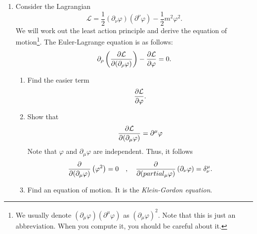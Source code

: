 \documentclass[a4paper,pdftex]{article}
\begin{document}
\begin{enumerate}
   \item 
   Consider the Lagrangian
   \begin{equation}
      \mathcal{L}
      =
      \frac{1}{2}
      (\partial_{\nu}\varphi)
      (\partial^{\nu}\varphi)
      -
      \frac{1}{2}m^2\varphi^2
      .
   \end{equation}
   We will work out the least action principle and derive the equation of motion\footnote{
      We usually denote $(\partial_{\mu}\varphi)(\partial^{\mu}\varphi)$ as $(\partial_{\mu}\varphi)^2$. Note that this is just an abbreviation. When you compute it, you should be careful about it.
   }. The Euler-Lagrange equation is as follows:
   \begin{equation}
      \partial_{\rho}
      \left(  
         \pdv{\mathcal{L}}{(\partial_{\rho}\varphi)}
      \right)
      -
      \pdv{\mathcal{L}}{\varphi}
      =
      0
      .
   \end{equation}
   \begin{enumerate}
      \item 
      Find the easier term
      \begin{equation}
         \pdv{\mathcal{L}}{\varphi}
         .
      \end{equation}

      \item 
      Show that 
      \begin{equation}
         \pdv{\mathcal{L}}{(\partial_{\mu}\varphi)}
         =
         \partial^{\mu}\varphi
      \end{equation}
      Note that $\varphi$ and $\partial_{\mu}\varphi$ are independent. Thus, it follows
      \begin{equation}
         \pdv{}{(\partial_{\mu}\varphi)}
         \left(\varphi^2\right)
         =
         0
         \quad
         ,
         \quad
         \pdv{}{(\\partial_{\mu}\varphi)}
         \left(\partial_{\nu}\varphi\right)
         =
         \delta^{\mu}_{\nu}
         .
      \end{equation}

      \item 
      Find an equation of motion. It is the \textit{Klein-Gordon equation}.
   \end{enumerate}   


\end{enumerate}
\end{document}

